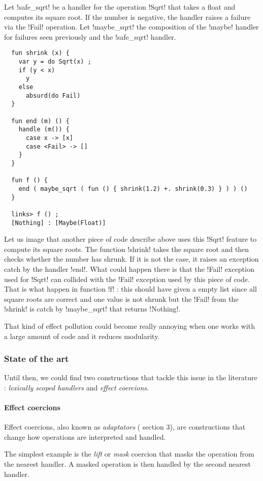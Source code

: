 \documentclass[11pt, nonacm=true, language=french, language=english]{acmart}
\begin{document}
Let !safe_sqrt! be a handler for the operation !Sqrt! that takes a float and computes its square root. If the number is negative, the handler raises a failure via the !Fail! operation. Let !maybe_sqrt! the composition of the !maybe! handler for failures seen previously and the !safe_sqrt! handler.
\begin{lstlisting}
  fun shrink (x) {
    var y = do Sqrt(x) ;
    if (y < x)
      y
    else
      absurd(do Fail)
  }

  fun end (m) () {
    handle (m()) {
      case x -> [x]
      case <Fail> -> []
    }
  }

  fun f () {
    end ( maybe_sqrt ( fun () { shrink(1.2) +. shrink(0.3) } ) ) ()
  }

  links> f () ;
  [Nothing] : [Maybe(Float)]
\end{lstlisting}

Let us image that another piece of code describe above uses this !Sqrt! feature to compute its square roots. The function !shrink! takes the square root and then checks whether the number has shrunk. If it is not the case, it raises an exception catch by the handler !end!. What could happen there is that the !Fail! exception used for !Sqrt! can collided with the !Fail! exception used by this piece of code. That is what happen in function !f! : this should have given a empty list since all square roots are correct and one value is not shrunk but the !Fail! from the !shrink! is catch by !maybe_sqrt! that returns !Nothing!.

That kind of effect pollution could become really annoying when one works with a large amount of code and it reduces modularity.

\subsubsection{State of the art}
\label{sec:state-art}

Until then, we could find two constructions that tackle this issue in the literature : \emph{lexically scoped handlers} and \emph{effect coercions}.

\paragraph{Effect coercions}
Effect coercions, also known as \emph{adaptators} (\citep{doobeedoo} section 3), are constructions that change how operations are interpreted and handled.

The simplest example is the \emph{lift} or \emph{mask} coercion that masks the operation from the nearest handler. A masked operation is then handled by the second nearest handler.
\end{document}
